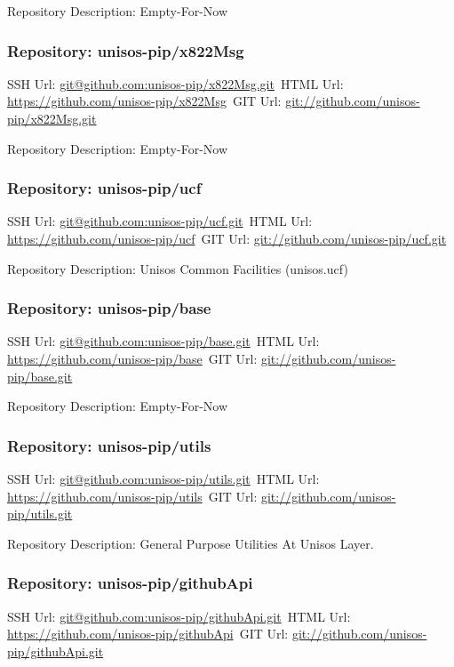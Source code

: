 Repository Description: Empty-For-Now

\subsubsection{Repository: unisos-pip/x822Msg}

SSH Url:  \url{git@github.com:unisos-pip/x822Msg.git}\
HTML Url: \url{https://github.com/unisos-pip/x822Msg}\
GIT Url:  \url{git://github.com/unisos-pip/x822Msg.git}

Repository Description: Empty-For-Now

\subsubsection{Repository: unisos-pip/ucf}

SSH Url:  \url{git@github.com:unisos-pip/ucf.git}\
HTML Url: \url{https://github.com/unisos-pip/ucf}\
GIT Url:  \url{git://github.com/unisos-pip/ucf.git}

Repository Description: Unisos Common Facilities (unisos.ucf)

\subsubsection{Repository: unisos-pip/base}

SSH Url:  \url{git@github.com:unisos-pip/base.git}\
HTML Url: \url{https://github.com/unisos-pip/base}\
GIT Url:  \url{git://github.com/unisos-pip/base.git}

Repository Description: Empty-For-Now

\subsubsection{Repository: unisos-pip/utils}

SSH Url:  \url{git@github.com:unisos-pip/utils.git}\
HTML Url: \url{https://github.com/unisos-pip/utils}\
GIT Url:  \url{git://github.com/unisos-pip/utils.git}

Repository Description: General Purpose Utilities At Unisos Layer.

\subsubsection{Repository: unisos-pip/githubApi}

SSH Url:  \url{git@github.com:unisos-pip/githubApi.git}\
HTML Url: \url{https://github.com/unisos-pip/githubApi}\
GIT Url:  \url{git://github.com/unisos-pip/githubApi.git}

